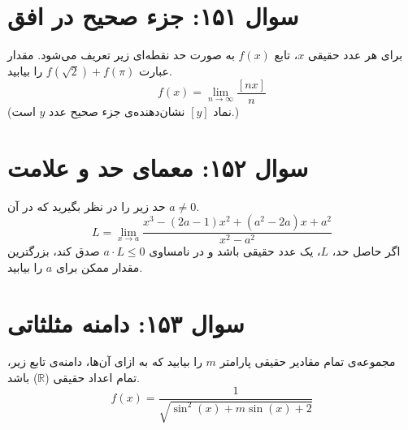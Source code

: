 \documentclass[12pt]{article}
\begin{document}
\vspace{1cm}
\hrulefill
\vspace{1cm}

\section*{سوال ۱۵۱: جزء صحیح در افق}
برای هر عدد حقیقی \(x\)، تابع \(f(x)\) به صورت حد نقطه‌ای زیر تعریف می‌شود. مقدار عبارت \newline\( f(\sqrt{2}) + f(\pi) \) را بیابید.
\begin{displaymath}
	f(x) = \lim_{n \to \infty} \frac{[nx]}{n}
\end{displaymath}
(نماد \( [y] \) نشان‌دهنده‌ی جزء صحیح عدد \(y\) است.)

\vspace{1cm}
\hrulefill
\vspace{1cm}


\section*{سوال ۱۵۲: معمای حد و علامت}
حد زیر را در نظر بگیرید که در آن \(a \ne 0\).
\begin{displaymath}
	L = \lim_{x \to a} \frac{x^3 - (2a-1)x^2 + (a^2-2a)x + a^2}{x^2 - a^2}
\end{displaymath}
اگر حاصل حد، \(L\)، یک عدد حقیقی باشد و در نامساوی \( a \cdot L \le 0 \) صدق کند، بزرگترین مقدار ممکن برای \(a\) را بیابید.

\vspace{1cm}
\hrulefill
\vspace{1cm}

\section*{سوال ۱۵۳: دامنه مثلثاتی}
مجموعه‌ی تمام مقادیر حقیقی پارامتر \(m\) را بیابید که به ازای آن‌ها، دامنه‌ی تابع زیر، تمام اعداد حقیقی (\(\mathbb{R}\)) باشد.
\begin{displaymath}
	f(x) = \frac{1}{\sqrt{\sin^2(x) + m\sin(x) + 2}}
\end{displaymath}
\end{document}
